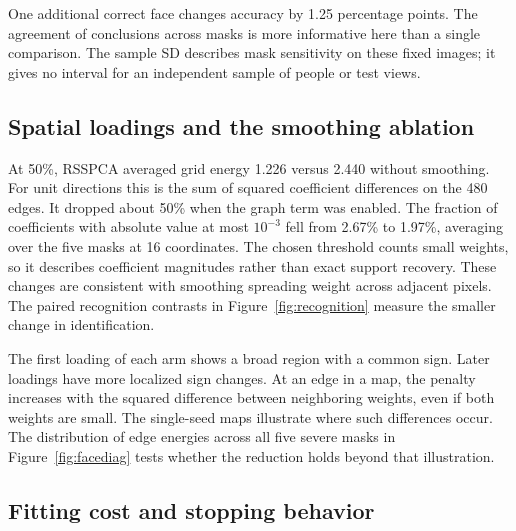 One additional correct face changes accuracy by 1.25 percentage points. The agreement of conclusions across masks is more informative here than a single comparison. The sample SD describes mask sensitivity on these fixed images; it gives no interval for an independent sample of people or test views.

\clearpage
\subsection{Spatial loadings and the smoothing ablation}


At 50\%, RSSPCA averaged grid energy 1.226 versus 2.440 without smoothing. For unit directions this is the sum of squared coefficient differences on the 480 edges. It dropped about 50\% when the graph term was enabled. The fraction of coefficients with absolute value at most $10^{-3}$ fell from 2.67\% to 1.97\%, averaging over the five masks at 16 coordinates. The chosen threshold counts small weights, so it describes coefficient magnitudes rather than exact support recovery. These changes are consistent with smoothing spreading weight across adjacent pixels. The paired recognition contrasts in Figure~\ref{fig:recognition} measure the smaller change in identification.

The first loading of each arm shows a broad region with a common sign. Later loadings have more localized sign changes. At an edge in a map, the penalty increases with the squared difference between neighboring weights, even if both weights are small. The single-seed maps illustrate where such differences occur. The distribution of edge energies across all five severe masks in Figure~\ref{fig:facediag} tests whether the reduction holds beyond that illustration.

\clearpage
\subsection{Fitting cost and stopping behavior}
\label{sec:face-diagnostics}


